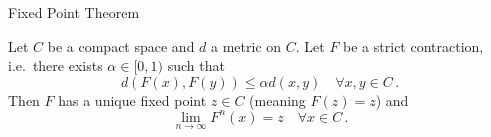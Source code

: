 \begin{frame}{Fixed Point Theorem}
\begin{theorem}
Let $C$ be a compact space and $d$ a metric on $C$. Let $F$ be a strict contraction, i.e.\ there exists $\alpha \in [0,1)$ such that
\begin{equation}
   d(F(x), F(y)) \leq \alpha d(x,y) \quad \forall x,y \in C\,.
\end{equation}
Then $F$ has a unique fixed point $z \in C$ (meaning $F(z) = z$) and
\begin{equation}
    \lim_{n \rightarrow \infty} F^n(x) = z \quad \forall x \in C\,.
\end{equation}
\end{theorem}
\end{frame}